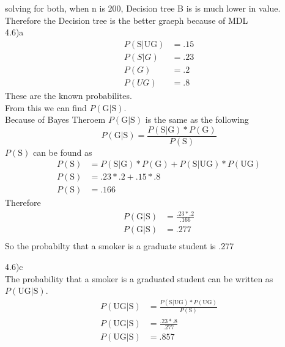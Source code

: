 \documentclass[12pt,english]{article}
\begin{document}
solving for both, when n is 200, Decision tree B is is much lower in value. Therefore the Decision tree is the better graeph because of MDL\\
4.6)a\\
\begin{equation}\tag{1}\label{eq:1}
\begin{split}
P(\mbox{S}\vert \mbox{UG}) &= .15 \\
P(S\vert G) &= .23\\
P(G) &= .2\\
P(UG) &= .8
\end{split}
\end{equation}
These are the known probabilites.\\
 From this we can find $P(\mbox{G}\vert \mbox{S})$.\\
Because of Bayes Theroem  $P(\mbox{G}\vert \mbox{S})$ is the same as the following
\begin{equation}
P(\mbox{G}\vert \mbox{S}) = \frac{P(\mbox{S} \vert \mbox{G}) * P(\mbox{G})}{P(\mbox{S})}
\end{equation}
$P(\mbox{S})$ can be found as
\begin{equation}
\begin{split}
P(\mbox{S}) &=  P(\mbox{S} \vert \mbox{G}) * P(\mbox{G}) + P(\mbox{S} \vert \mbox{UG}) * P(\mbox{UG})\\
P(\mbox{S}) &= .23 *.2 + .15 * .8\\
P(\mbox{S}) &=.166
\end{split}
\end{equation}
Therefore
\begin{equation}
\begin{split}
P(\mbox{G}\vert \mbox{S}) &= \frac{.23 * .2}{.166}\\
P(\mbox{G}\vert \mbox{S}) &= .277\\
\end{split}
\end{equation}
 So the probabilty that a smoker is a graduate student is .277\par
 4.6)c\\
The probability that a smoker is a graduated student  can be written as  $P(\mbox{UG}\vert \mbox{S})$.\\
\begin{equation}
\begin{split}
P(\mbox{UG}\vert \mbox{S}) &=  \frac{P(\mbox{S} \vert \mbox{UG}) * P(\mbox{UG})}{P(\mbox{S})}\\
P(\mbox{UG}\vert \mbox{S}) &=\frac{.23 * .8}{.277}\\
P(\mbox{UG}\vert \mbox{S}) &=.857\\
\end{split}
\end{equation}
\end{document}
